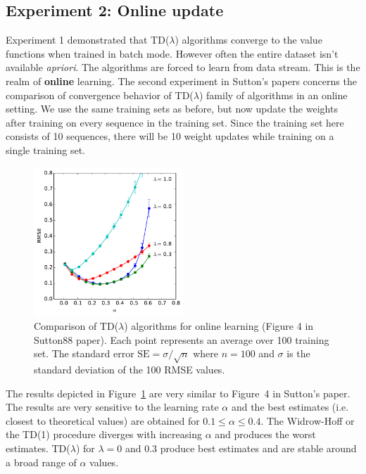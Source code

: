 \documentclass[conference]{IEEEtran}
\begin{document}
\subsection{Experiment 2: Online update}
Experiment 1 demonstrated that TD($\lambda$) algorithms converge to the value functions when trained in batch mode. However often the entire dataset isn't available {\em apriori}. The algorithms are forced to learn from data stream. This is the realm of {\bf online} learning. The second experiment in Sutton's papers concerns the comparison of convergence behavior of TD($\lambda$) family of algorithms in an online setting. We use the same training sets as before, but now update the weights after training on every sequence in the training set. Since the training set here consists of 10 sequences, there will be 10 weight updates while training on a single training set. 
\begin{figure}[!bt]
\includegraphics[width=0.5\textwidth]{./figures/fig4.pdf}
\caption{Comparison of TD($\lambda$) algorithms for online learning (Figure 4 in Sutton88 paper). Each point represents an average over 100 training set. The standard error $\text{SE} = \sigma/\sqrt{n}$ where $n=100$ and $\sigma$ is the standard deviation of the 100 RMSE values.\label{fig:expt2a}}
\end{figure}

The results depicted in Figure~\ref{fig:expt2a} are very similar to Figure~4 in Sutton's paper. The results are very sensitive to the learning rate $\alpha$ and the best estimates (i.e. closest to theoretical values) are obtained for $0.1 \leqslant \alpha \leqslant 0.4$. The Widrow-Hoff or the TD(1) procedure diverges with increasing $\alpha$  and produces the worst estimates. TD($\lambda$) for $\lambda = 0$ and $0.3$ produce best estimates and are stable around a broad range of $\alpha$ values. 
\end{document}
